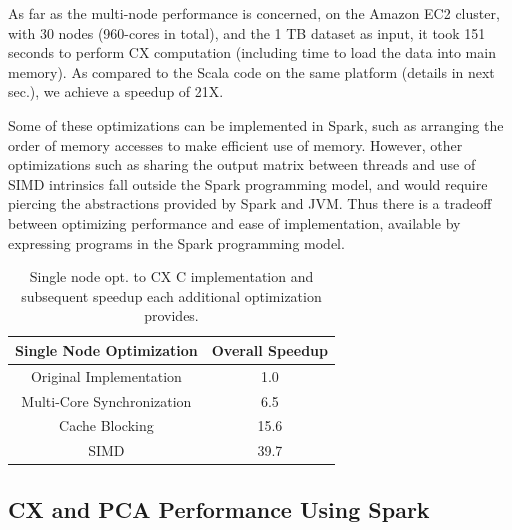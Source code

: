         As far as the multi-node performance is concerned, 
 on the Amazon EC2 cluster, with 30 nodes (960-cores in total), and
 the 1 TB dataset as input, it
 took 151 seconds to perform CX computation (including time to load
 the data into main memory). 
 As compared to the Scala code on the same platform (details in
 next sec.), we achieve a speedup of 21X.

 Some of these optimizations can be implemented in Spark, such as arranging the
 order of memory accesses to make efficient use of memory. %
 However, other optimizations such as sharing the output matrix between threads
 and use of SIMD intrinsics fall outside the Spark programming model, and would
 require piercing the abstractions provided by Spark and JVM.
 Thus there is a tradeoff between optimizing performance 
 and ease of implementation, %
 available by expressing programs in the Spark programming model.

 
  \begin{table}
  \begin{center}
  \begin{tabular}{ |c|c| } 
  \hline
  Single Node Optimization & Overall Speedup\\
  \hline
  Original Implementation & 1.0  \\
  Multi-Core Synchronization & 6.5 \\
  Cache Blocking & 15.6 \\
  SIMD & 39.7 \\
  \hline

  \end{tabular}
  \end{center}
  \caption{Single node opt. to CX C implementation and
  subsequent speedup  each additional optimization provides.}
  \label{tab:single_node}
  \end{table}
 



  \subsection{CX and PCA Performance Using Spark} %

